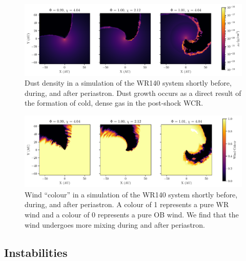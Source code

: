 \documentclass[fleqn,usenatbib]{mnras}
\begin{document}
\begin{figure}
  \centering
  \includegraphics[width=0.95\linewidth]{assets/periastron-3-rhod.pdf}
  \caption[Dust density in a simulation of the WR140 system]{Dust density in a simulation of the WR140 system shortly before, during, and after periastron. Dust growth occurs as a direct result of the formation of cold, dense gas in the post-shock WCR.}
  \label{fig:p2-fullpage-rhod}
\end{figure}

\begin{figure}
  \centering
  \includegraphics[width=0.95\linewidth]{assets/periastron-3-r0.pdf}
  \caption[Wind ``colour'' in a simulation of the WR140 system]{Wind ``colour'' in a simulation of the WR140 system shortly before, during, and after periastron. A colour of 1 represents a pure WR wind and a colour of 0 represents a pure OB wind. We find that the wind undergoes more mixing during and after periastron.}
  \label{fig:p2-fullpage-r0}
\end{figure}

\subsection{Instabilities}
\label{sec:p2-instab}

\end{document}
